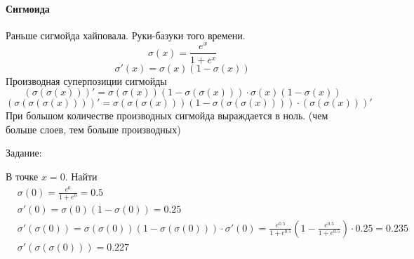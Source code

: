 \newpage
\paragraph{Сигмоида}\mbox{}\par
Раньше сигмойда хайповала. Руки-базуки того времени.
\[
  \sigma(x) = \frac{e^{x}}{1 + e^{x}}
\] 
\[
  \sigma'(x) = \sigma(x) (1-\sigma(x)) 
\] 
Производная суперпозиции сигмойды
\[
  (\sigma(\sigma(x)))' = \sigma(\sigma(x)) (1-\sigma(\sigma(x)))\cdot
  \sigma(x)(1 - \sigma(x))
\] 
\[
  (\sigma(\sigma(\sigma(x))))' =
  \sigma(\sigma(\sigma(x)))(1-\sigma(\sigma(\sigma(x)))) \cdot
  (\sigma(\sigma(x)))'
\] 
При большом количестве производных сигмойда выраждается в ноль. (чем больше
слоев, тем больше производных)

Задание:\par
В точке $x = 0$. Найти 
\[
  \begin{aligned}
    & \sigma(0) = \frac{e^{0}}{1 + e^{0}} = 0.5 \\
    & \sigma'(0) = \sigma(0)(1-\sigma(0)) = 0.25 \\
    & \sigma'(\sigma(0)) = \sigma(\sigma(0)) (1 - \sigma(\sigma(0))) \cdot
      \sigma'(0) = \frac{e^{0.5}}{1+e^{0.5}} (1 - \frac{e^{0.5}}{1 + e^{0.5}}) 
      \cdot 0.25 = 0.235 \\
    & \sigma'(\sigma(\sigma(0))) = 0.227
  \end{aligned}
\] 
